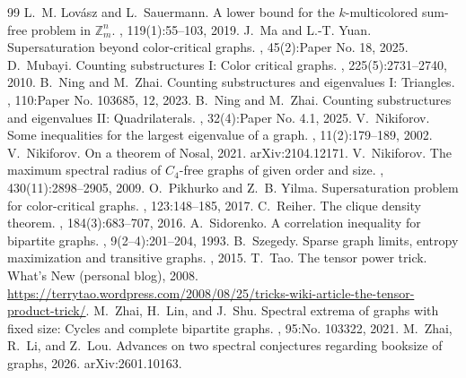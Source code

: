 \documentclass[10pt,a4paper]{amsart}
\begin{document}
\begin{thebibliography}{99}
 L.~M. Lov{\'a}sz and L.~Sauermann. \newblock A lower bound for the $k$-multicolored sum-free problem in $\mathbb{Z}_m^n$. , 119(1):55--103, 2019.
 J.~Ma and L.-T. Yuan. \newblock Supersaturation beyond color-critical graphs. , 45(2):Paper No. 18, 2025.
 D.~Mubayi. \newblock Counting substructures {I}: {C}olor critical graphs. , 225(5):2731--2740, 2010.
 B.~Ning and M.~Zhai. \newblock Counting substructures and eigenvalues {I}: {Triangles}. , 110:Paper No. 103685, 12, 2023.
 B.~Ning and M.~Zhai. \newblock Counting substructures and eigenvalues {II}: {Quadrilaterals}. , 32(4):Paper No. 4.1, 2025.
 V.~Nikiforov. \newblock Some inequalities for the largest eigenvalue of a graph. , 11(2):179--189, 2002.
 V.~Nikiforov. \newblock On a theorem of {Nosal}, 2021. \newblock arXiv:2104.12171.
 V.~Nikiforov. \newblock The maximum spectral radius of {$C_4$}-free graphs of given order and size. , 430(11):2898--2905, 2009.
 O.~Pikhurko and Z.~B. Yilma. \newblock Supersaturation problem for color-critical graphs. , 123:148--185, 2017.
 C.~Reiher. \newblock The clique density theorem. , 184(3):683--707, 2016.
 A.~Sidorenko. \newblock A correlation inequality for bipartite graphs. , 9(2--4):201--204, 1993.
 B.~Szegedy. \newblock Sparse graph limits, entropy maximization and transitive graphs. , 2015.
 T.~Tao. \newblock The tensor power trick. \newblock What's New (personal blog), 2008. \newblock \url{https://terrytao.wordpress.com/2008/08/25/tricks-wiki-article-the-tensor-product-trick/}.
 M.~Zhai, H.~Lin, and J.~Shu. \newblock Spectral extrema of graphs with fixed size: {Cycles} and complete bipartite graphs. , 95:No. 103322, 2021.
 M.~Zhai, R.~Li, and Z.~Lou. \newblock Advances on two spectral conjectures regarding booksize of graphs, 2026. \newblock arXiv:2601.10163.
\end{thebibliography}
\end{document}
